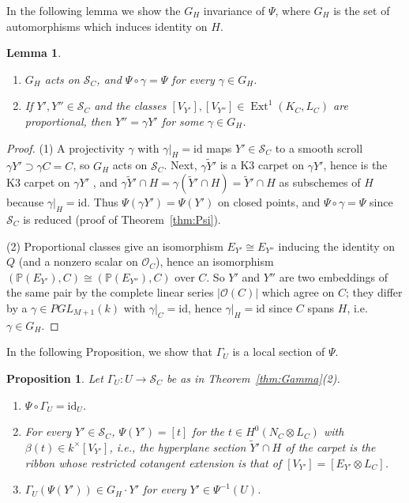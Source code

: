 \documentclass[11pt,twoside]{amsart}
\theoremstyle{plain}
\newtheorem{proposition}[theorem]{Proposition}
\newtheorem{lemma}[theorem]{Lemma}
\theoremstyle{definition}
\newcommand{\PP}{\mathbb{P}}
\newcommand{\OO}{\mathcal{O}}
\newcommand{\Ext}{\operatorname{Ext}}
\newcommand{\id}{\mathrm{id}}
\newcommand{\Yt}{\widetilde{Y}}
\newcommand{\SC}{\mathcal{S}_C}
\newcommand{\GH}{G_H}
\begin{document}
In the following lemma we show the $G_H$ invariance of $\Psi$, where $G_H$ is the set of automorphisms which induces identity on $H$.

\begin{lemma}\label{lem:GH}
\begin{enumerate}
\item $\GH$ acts on $\SC$, and $\Psi\circ\gamma=\Psi$ for every $\gamma\in\GH$.
\item If $Y',Y''\in\SC$ and the classes $[V_{Y'}],[V_{Y''}]\in\Ext^1(K_C,L_C)$ are proportional, then $Y''=\gamma Y'$ for some $\gamma\in\GH$.
\end{enumerate}
\end{lemma}

\begin{proof}
(1) A projectivity $\gamma$ with $\gamma|_H=\id$ maps $Y'\in\SC$ to a smooth scroll $\gamma Y'\supset\gamma C=C$, so $\GH$ acts on $\SC$. Next, $\gamma\Yt'$ is a K3 carpet on $\gamma Y'$, hence is the K3 carpet on $\gamma Y'$ \cite[Prop.~1.7]{GP97}, and $\gamma\Yt'\cap H=\gamma(\Yt'\cap H)=\Yt'\cap H$ as subschemes of $H$ because $\gamma|_H=\id$. Thus $\Psi(\gamma Y')=\Psi(Y')$ on closed points, and $\Psi\circ\gamma=\Psi$ since $\SC$ is reduced (proof of Theorem~\ref{thm:Psi}).

(2) Proportional classes give an isomorphism $E_{Y'}\cong E_{Y''}$ inducing the identity on $Q$ (and a nonzero scalar on $\OO_C$), hence an isomorphism $(\PP(E_{Y'}),C)\cong(\PP(E_{Y''}),C)$ over $C$. So $Y'$ and $Y''$ are two embeddings of the same pair by the complete linear series $|\OO(C)|$ which agree on $C$; they differ by a $\gamma\in PGL_{M+1}(k)$ with $\gamma|_C=\id$, hence $\gamma|_H=\id$ since $C$ spans $H$, i.e.\ $\gamma\in\GH$.
\end{proof}

In the following Proposition, we show that $\Gamma_U$ is a local section of $\Psi$.

\begin{proposition}\label{prop:BEsection}
Let $\Gamma_U\colon U\to\SC$ be as in Theorem~\ref{thm:Gamma}(2).
\begin{enumerate}
\item $\Psi\circ\Gamma_U=\id_U$.
\item For every $Y'\in\SC$, $\Psi(Y')=[t]$ for the $t\in H^0(N_C\otimes L_C)$ with $\beta(t)\in k^{\times}[V_{Y'}]$, i.e., the hyperplane section $\Yt'\cap H$ of the carpet is the ribbon whose restricted cotangent extension is that of $[V_{Y'}]=[E_{Y'}\otimes L_C]$.
\item $\Gamma_U(\Psi(Y'))\in\GH\cdot Y'$ for every $Y'\in\Psi^{-1}(U)$.
\end{enumerate}
\end{proposition}
\end{document}
